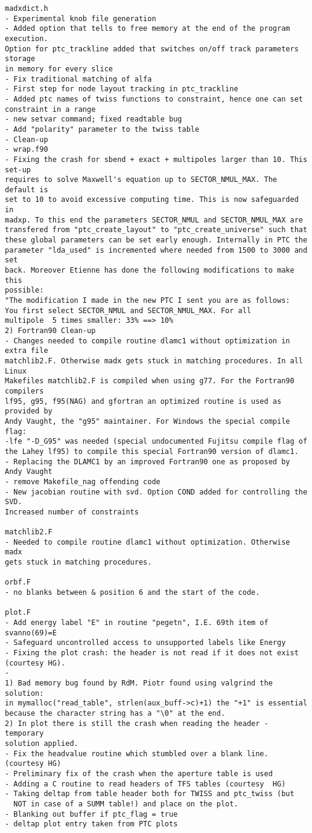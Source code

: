 \begin{verbatim}
madxdict.h
- Experimental knob file generation
- Added option that tells to free memory at the end of the program execution. 
Option for ptc_trackline added that switches on/off track parameters storage 
in memory for every slice
- Fix traditional matching of alfa
- First step for node layout tracking in ptc_trackline
- Added ptc names of twiss functions to constraint, hence one can set 
constraint in a range
- new setvar command; fixed readtable bug
- Add "polarity" parameter to the twiss table
- Clean-up
- wrap.f90
- Fixing the crash for sbend + exact + multipoles larger than 10. This set-up
requires to solve Maxwell's equation up to SECTOR_NMUL_MAX. The default is
set to 10 to avoid excessive computing time. This is now safeguarded in
madxp. To this end the parameters SECTOR_NMUL and SECTOR_NMUL_MAX are
transfered from "ptc_create_layout" to "ptc_create_universe" such that
these global parameters can be set early enough. Internally in PTC the
parameter "lda_used" is incremented where needed from 1500 to 3000 and set
back. Moreover Etienne has done the following modifications to make this
possible:
"The modification I made in the new PTC I sent you are as follows:
You first select SECTOR_NMUL and SECTOR_NMUL_MAX. For all
multipole  5 times smaller: 33% ==> 10%
2) Fortran90 Clean-up
- Changes needed to compile routine dlamc1 without optimization in extra file
matchlib2.F. Otherwise madx gets stuck in matching procedures. In all Linux
Makefiles matchlib2.F is compiled when using g77. For the Fortran90 compilers
lf95, g95, f95(NAG) and gfortran an optimized routine is used as provided by
Andy Vaught, the "g95" maintainer. For Windows the special compile flag:
-lfe "-D_G95" was needed (special undocumented Fujitsu compile flag of
the Lahey lf95) to compile this special Fortran90 version of dlamc1.
- Replacing the DLAMC1 by an improved Fortran90 one as proposed by
Andy Vaught
- remove Makefile_nag offending code
- New jacobian routine with svd. Option COND added for controlling the SVD. 
Increased number of constraints

matchlib2.F
- Needed to compile routine dlamc1 without optimization. Otherwise madx
gets stuck in matching procedures.

orbf.F
- no blanks between & position 6 and the start of the code.

plot.F
- Add energy label "E" in routine "pegetn", I.E. 69th item of svanno(69)=E
- Safeguard uncontrolled access to unsupported labels like Energy
- Fixing the plot crash: the header is not read if it does not exist
(courtesy HG).
-
1) Bad memory bug found by RdM. Piotr found using valgrind the solution:
in mymalloc("read_table", strlen(aux_buff->c)+1) the "+1" is essential
because the character string has a "\0" at the end.
2) In plot there is still the crash when reading the header - temporary
solution applied.
- Fix the headvalue routine which stumbled over a blank line. (courtesy HG)
- Preliminary fix of the crash when the aperture table is used
- Adding a C routine to read headers of TFS tables (courtesy  HG)
- Taking deltap from table header both for TWISS and ptc_twiss (but
  NOT in case of a SUMM table!) and place on the plot.
- Blanking out buffer if ptc_flag = true
- deltap plot entry taken from PTC plots


\end{verbatim}
